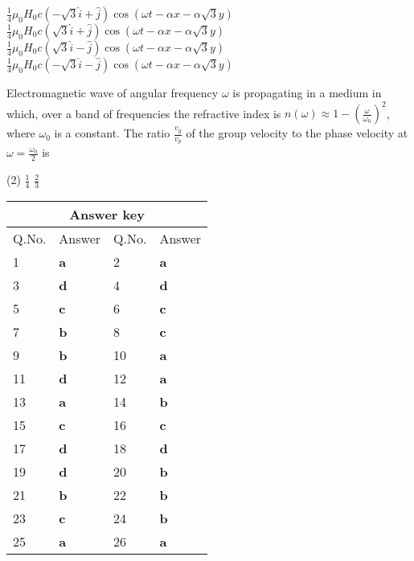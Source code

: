 \begin{enumerate}
\begin{tasks}
	\task[\textbf{A.}] $\frac{1}{4} \mu_{0} H_{0} c(-\sqrt{3} \hat{i}+\hat{j}) \cos (\omega t-\alpha x-\alpha \sqrt{3} y)$ 
	\task[\textbf{B.}] $\frac{1}{4} \mu_{0} H_{0} c(\sqrt{3} \hat{i}+\hat{j}) \cos (\omega t-\alpha x-\alpha \sqrt{3} y)$
	\task[\textbf{C.}]$\frac{1}{4} \mu_{0} H_{0} c(\sqrt{3} \hat{i}-\hat{j}) \cos (\omega t-\alpha x-\alpha \sqrt{3} y)$
	\task[\textbf{D.}]$\frac{1}{4} \mu_{0} H_{0} c(-\sqrt{3} \hat{i}-\hat{j}) \cos (\omega t-\alpha x-\alpha \sqrt{3} y)$
\end{tasks}
\begin{minipage}{\textwidth}
	\item Electromagnetic wave of angular frequency $\omega$ is propagating in a medium in which, over a band of frequencies the refractive index is $n(\omega) \approx 1-\left(\frac{\omega}{\omega_{0}}\right)^{2}$, where $\omega_{0}$ is a constant. The ratio $\frac{v_{g}}{v_{p}}$ of the group velocity to the phase velocity at $\omega=\frac{\omega_{0}}{2}$ is
\end{minipage}
\begin{tasks}(2)
	\task[\textbf{B.}]$\frac{1}{4}$
	\task[\textbf{C.}]$\frac{2}{3}$
\end{tasks}

\end{enumerate}


\setlength\arrayrulewidth{1pt}
\begin{table}[H]
	\centering
	
	\begin{tabular}{|p{1.5cm}|p{1.5cm}||p{1.5cm}|p{1.5cm}|}
		\hline
		\multicolumn{4}{|c|}{\textbf{Answer key}}\\\hline\hline
		\rowcolor{ocrel}Q.No.&Answer&Q.No.&Answer\\\hline
		1&\textbf{a}&2&\textbf{a}\\\hline
		3&\textbf{d}&4&\textbf{d}\\\hline
		5&\textbf{c}&6&\textbf{c}\\\hline
		7&\textbf{b}&8&\textbf{c}\\\hline
		9&\textbf{b}&10&\textbf{a}\\\hline
		11&\textbf{d}&12&\textbf{a}\\\hline
		13&\textbf{a}&14&\textbf{b}\\\hline
		15&\textbf{c}&16&\textbf{c}\\\hline
		17&\textbf{d}&18&\textbf{d}\\\hline
		19&\textbf{d}&20&\textbf{b}\\\hline
		21&\textbf{b}&22&\textbf{b}\\\hline
		23&\textbf{c}&24&\textbf{b}\\\hline
		25&\textbf{a}&26&\textbf{a}\\\hline
	\end{tabular}
\end{table}
       
